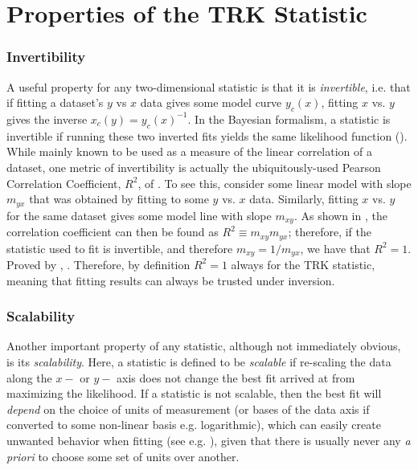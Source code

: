 \chapter{Properties of the TRK Statistic}
\label{cha:properties}

\subsection{Invertibility}
\label{sec:invertibility}
A useful property for any two-dimensional statistic is that it is \textit{invertible}, i.e. that if fitting a dataset's $y$ vs $x$ data gives some model curve $y_c(x)$, fitting $x$ vs. $y$ gives the inverse $x_c(y)=y_c(x)^{-1}$. In the Bayesian formalism, a statistic is invertible if running these two inverted fits yields the same likelihood function (\textcite{trotter}). While mainly known to be used as a measure of the linear correlation of a dataset, one metric of invertibility is actually the ubiquitously-used Pearson Correlation Coefficient, $R^2$, of \textcite{pearson1896vii}. To see this, consider some linear model with slope $m_{yx}$ that was obtained by fitting to some $y$ vs. $x$ data. Similarly, fitting $x$ vs. $y$ for the same dataset gives some model line with slope $m_{xy}$. As shown in \textcite{trotter}, the correlation coefficient can then be found as $R^2\equiv m_{xy}m_{yx}$; therefore, if the statistic used to fit is invertible, and therefore $m_{xy}=1/m_{yx}$, we have that $R^2=1$. Proved by \textcite{trotter}, \textcite{the TRK statistic is completely invertible}. Therefore, by definition $R^2=1$ always for the TRK statistic, meaning that fitting results can always be trusted under inversion.

\subsection{Scalability}
\label{sec:scalability}
Another important property of any statistic, although not immediately obvious, is its \textit{scalability}. Here, a statistic is defined to be \textit{scalable} if re-scaling the data along the $x-$ or $y-$ axis does not change the best fit arrived at from maximizing the likelihood. If a statistic is not scalable, then the best fit will \textit{depend} on the choice of units of measurement (or bases of the data axis if converted to some non-linear basis e.g. logarithmic), which can easily create unwanted behavior when fitting (see e.g. \textcite{trotter}), given that there is usually never any \textit{a priori} to choose some set of units over another.

